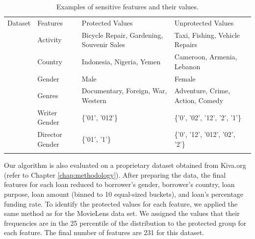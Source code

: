 \begin{table}[!hbt]
\small
\centering
    \begin{tabularx}{\textwidth}{!{\vrule width 0.8pt}X!{\vrule width 0.8pt}X!{\vrule width 0.8pt}X!{\vrule width 0.8pt}X!{\vrule width 0.8pt}}
        Dataset & Features & Protected Values & Unprotected Values \\
         & 
        Activity & Bicycle Repair, Gardening, Souvenir Sales & Taxi, Fishing, Vehicle Repairs \\  
        &  Country &  Indonesia, Nigeria, Yemen &  Cameroon, Armenia, Lebanon \\
        & Gender & Male & Female \\
        
         &  Genres &  Documentary, Foreign, War, Western &  Adventure, Crime, Action, Comedy\\ 
        & Writer Gender & \{'01', '012'\} & \{'0', '02', '12', '2', '1'\} \\ 
        & Director Gender & \{'01', '1'\} &  \{'0', '12', '012', '02', '2'\} \\
    \end{tabularx}
    \caption{Examples of sensitive features and their values.}
    \label{table:sensitive_features_table}
\end{table}

Our algorithm is also evaluated on a proprietary dataset obtained from Kiva.org (refer to Chapter \ref{chap:methodology}). 
After preparing the data, the final features for each loan reduced to borrower's gender, borrower's country, loan purpose, loan amount (binned to 10 equal-sized buckets), and loan's percentage funding rate. 
To identify the protected values for each feature, we applied the same method as for the MovieLens data set. We assigned the values that their frequencies are in the 25 percentile of the distribution to the protected group for each feature. The final number of features are 231 for this dataset.

